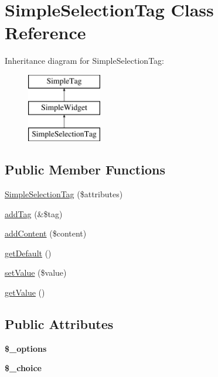 \hypertarget{class_simple_selection_tag}{
\section{SimpleSelectionTag Class Reference}
\label{class_simple_selection_tag}
}
Inheritance diagram for SimpleSelectionTag:\begin{figure}[H]
\begin{center}
\leavevmode
\includegraphics[height=3.000000cm]{class_simple_selection_tag}
\end{center}
\end{figure}
\subsection*{Public Member Functions}
\begin{DoxyCompactItemize}
\item 
\hyperlink{class_simple_selection_tag_aa82896cb091f3f88898310e5dcfbf446}{SimpleSelectionTag} (\$attributes)
\item 
\hyperlink{class_simple_selection_tag_aa7547a0f3b171987ad686049822a1446}{addTag} (\&\$tag)
\item 
\hyperlink{class_simple_selection_tag_a168eec24b5c2d95c4e7e0eebfca9f4d7}{addContent} (\$content)
\item 
\hyperlink{class_simple_selection_tag_ab515be0efa0968f8e74f3ed2312b3463}{getDefault} ()
\item 
\hyperlink{class_simple_selection_tag_a3cf6ad438463a73871ef02f729a7b25b}{setValue} (\$value)
\item 
\hyperlink{class_simple_selection_tag_a2eb746b2b426205f78ff4eecf6f335a0}{getValue} ()
\end{DoxyCompactItemize}
\subsection*{Public Attributes}
\begin{DoxyCompactItemize}
\item 
\hypertarget{class_simple_selection_tag_a1184ec68dbc76022618a9aabdfece584}{
{\bfseries \$\_\-options}}
\label{class_simple_selection_tag_a1184ec68dbc76022618a9aabdfece584}

\item 
\hypertarget{class_simple_selection_tag_a3f83e9d2c05405e5127256206d353fbc}{
{\bfseries \$\_\-choice}}
\label{class_simple_selection_tag_a3f83e9d2c05405e5127256206d353fbc}

\end{DoxyCompactItemize}


